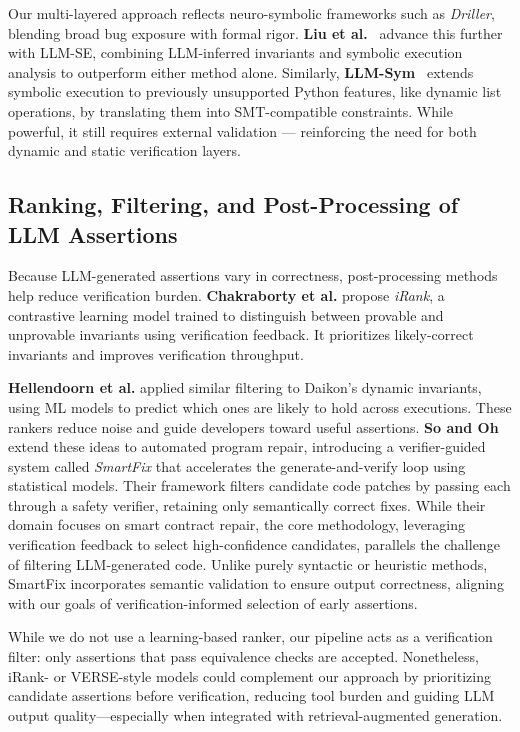 \documentclass[8pt]{extarticle}
\begin{document}
Our multi-layered approach reflects neuro-symbolic frameworks such as \textit{Driller}, blending broad bug exposure with formal rigor. \textbf{Liu et al.}~\cite{Liu2023-LLM-Sym-Inv} advance this further with LLM-SE, combining LLM-inferred invariants and symbolic execution analysis to outperform either method alone. Similarly, \textbf{LLM-Sym}~\cite{Wang2024-LLM-SymExec} extends symbolic execution to previously unsupported Python features, like dynamic list operations, by translating them into SMT-compatible constraints. While powerful, it still requires external validation — reinforcing the need for both dynamic and static verification layers.

\subsection{Ranking, Filtering, and Post-Processing of LLM Assertions}
Because LLM-generated assertions vary in correctness, post-processing methods help reduce verification burden. \textbf{Chakraborty et al.} \cite{Chakraborty2023-iRank} propose \textit{iRank}, a contrastive learning model trained to distinguish between provable and unprovable invariants using verification feedback. It prioritizes likely-correct invariants and improves verification throughput.

\textbf{Hellendoorn et al.} \cite{Hellendoorn2019-DAIKON-Ranking} applied similar filtering to Daikon's dynamic invariants, using ML models to predict which ones are likely to hold across executions. These rankers reduce noise and guide developers toward useful assertions. \textbf{So and Oh} \cite{SoOh2023SmartFix} extend these ideas to automated program repair, introducing a verifier-guided system called \textit{SmartFix} that accelerates the generate-and-verify loop using statistical models. Their framework filters candidate code patches by passing each through a safety verifier, retaining only semantically correct fixes. While their domain focuses on smart contract repair, the core methodology, leveraging verification feedback to select high-confidence candidates, parallels the challenge of filtering LLM-generated code. Unlike purely syntactic or heuristic methods, SmartFix incorporates semantic validation to ensure output correctness, aligning with our goals of verification-informed selection of early assertions.

While we do not use a learning-based ranker, our pipeline acts as a verification filter: only assertions that pass equivalence checks are accepted. Nonetheless, iRank- or VERSE-style models could complement our approach by prioritizing candidate assertions before verification, reducing tool burden and guiding LLM output quality—especially when integrated with retrieval-augmented generation.
\end{document}
